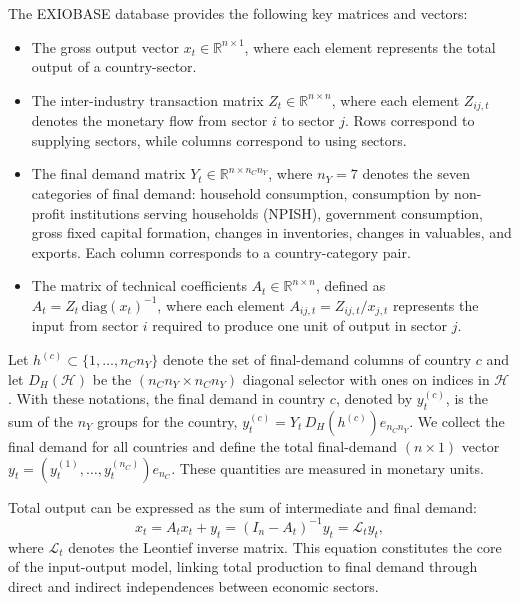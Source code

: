 The EXIOBASE database provides the following key matrices and vectors:
\begin{itemize}
    \item The gross output vector $x_t \in \mathbb{R}^{n \times 1}$, where each element represents the total output of a country-sector.

    \item The inter-industry transaction matrix $Z_t \in \mathbb{R}^{n \times n}$, where each element $Z_{ij,t}$ denotes the monetary flow from sector $i$ to sector $j$. Rows correspond to supplying sectors, while columns correspond to using sectors.

    \item The final demand matrix $Y_t \in \mathbb{R}^{n \times n_C n_Y}$, where $n_Y = 7$ denotes the seven categories of final demand: household consumption, consumption by non-profit institutions serving households (NPISH), government consumption, gross fixed capital formation, changes in inventories, changes in valuables, and exports. Each column corresponds to a country-category pair.

    \item The matrix of technical coefficients $A_t \in \mathbb{R}^{n \times n}$, defined as $A_t = Z_t \,\mathrm{diag}(x_t)^{-1}$, where each element $A_{ij,t} = Z_{ij,t} / x_{j,t}$ represents the input from sector $i$ required to produce one unit of output in sector $j$.
\end{itemize}

Let $h^{(c)} \subset \{1, \ldots, n_C n_Y\}$ denote the set of final-demand columns of country $c$ and let $D_H(\mathcal{H})$ be the $(n_C n_Y \times n_C n_Y)$ diagonal selector with ones on indices in $\mathcal{H}$. With these notations, the final demand in country $c$, denoted by $y_t^{(c)}$, is the sum of the $n_Y$ groups for the country, $y_t^{(c)} = Y_t\, D_H\!\left(h^{(c)}\right) e_{n_C n_Y}$. We collect the final demand for all countries and define the total final-demand $(n \times 1)$ vector $y_t = \left(y_t^{(1)}, \ldots, y_t^{(n_C)}\right)e_{n_C}$. These quantities are measured in monetary units.

Total output can be expressed as the sum of intermediate and final demand:
\begin{equation}
x_t = A_t x_t + y_t = (I_n - A_t)^{-1} y_t = \mathcal{L}_t y_t,
\end{equation}
where $\mathcal{L}_t$ denotes the Leontief inverse matrix. 
This equation constitutes the core of the input-output model, linking total production to final demand through direct and indirect independences between economic sectors.


